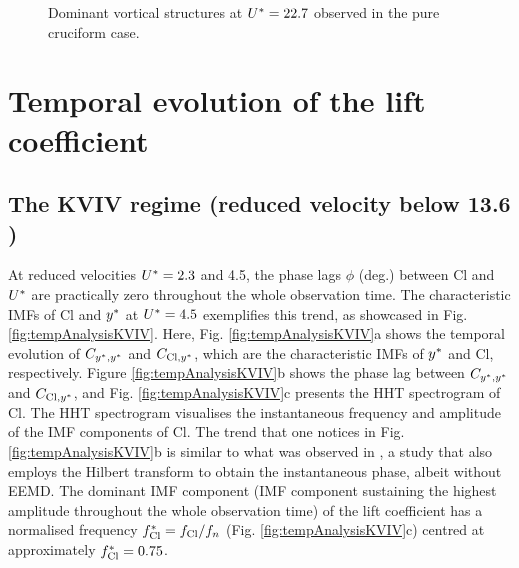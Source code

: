 \documentclass[oneside]{utmthesis}
\begin{document}
\begin{figure}
  \caption{Dominant vortical structures at $U^{*} = 22.7$ observed in the pure cruciform case.} \label{fig:vortStruct90}
\end{figure}

\section{Temporal evolution of the lift coefficient} \label{sec:tempEvo}

\subsection{The KVIV regime (reduced velocity below 13.6 )} \label{ssec:phaseLag}
At reduced velocities  $U^{*} = 2.3$ and 4.5, the phase lags  $\phi$ (deg.) between Cl and  $U^{*}$ are practically zero throughout the whole observation time. The characteristic IMFs of Cl and  $y^{*}$ at $U^{*} = 4.5$ exemplifies this trend, as showcased in Fig. \ref{fig:tempAnalysisKVIV}. Here, Fig. \ref{fig:tempAnalysisKVIV}a shows the temporal evolution of $C_{y^{*},y^{*}}$ and $C_{\text{Cl},y^{*}}$, which are the characteristic IMFs of $y^{*}$ and Cl, respectively. Figure \ref{fig:tempAnalysisKVIV}b shows the phase lag between $C_{y^{*},y^{*}}$ and $C_{\text{Cl},y^{*}}$, and Fig. \ref{fig:tempAnalysisKVIV}c presents the HHT spectrogram of Cl. The HHT spectrogram visualises the instantaneous frequency and amplitude of the IMF components of Cl. The trend that one notices in Fig. \ref{fig:tempAnalysisKVIV}b is similar to what was observed in \citet{Khalak1999}, a study that also employs the Hilbert transform to obtain the instantaneous phase, albeit without EEMD. The dominant IMF component (IMF component sustaining the highest amplitude throughout the whole observation time) of the lift coefficient has a normalised frequency $f_{\text{Cl}}^{*} = f_{\text{Cl}}/f_{n}$ (Fig. \ref{fig:tempAnalysisKVIV}c) centred at approximately $f_{\text{Cl}}^{*} = 0.75$.
\end{document}
